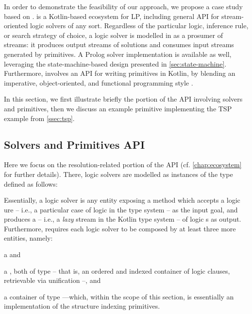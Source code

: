 \documentclass[12pt,a4paper,openright,twoside]{book}
\begin{document}
In order to demonstrate the feasibility of our approach, we propose a case study based on \twopkt{}.
%
\twopkt{} \cite{cco-softwarex-2021-2pkt} is a Kotlin-based ecosystem for LP, including general API for stream-oriented logic solvers of any sort.
%
Regardless of the particular logic, inference rule, or search strategy of choice, a logic solver is modelled in \twopkt{} as a prosumer of streams: it produces output streams of solutions and consumes input streams generated by primitives.
%
A Prolog solver implementation is available as well, leveraging the state-machine-based design presented in \cref{sec:state-machine}.
%
Furthermore, \twopkt{} involves an API for writing primitives in Kotlin, by blending an imperative, object-oriented, and functional programming style .

In this section, we first illustrate briefly the portion of the \twopkt{} API involving solvers and primitives, then we discuss an example primitive implementing the TSP example from \ref{ssec:tsp}.

\subsection{\twopkt{} Solvers and Primitives API}

Here we focus on the resolution-related portion of the \twopkt{} API (cf. \cref{chap:ecosystem} for further details).
%
There, logic solvers are modelled as instances of the  type defined as follows:
%

%
Essentially, a logic solver is any entity exposing a method  which accepts a logic ure -- i.e., a particular case of logic  in the \twopkt{} type system -- as the input goal, and produces a  -- i.e., a \emph{lazy} stream in the Kotlin type system -- of logic s as output.
%
Furthermore, \twopkt{} requires each logic solver to be composed by at least three more entities, namely:
%
\begin{inlinelist}
    \item a  and
    \item a , both of type  -- that is, an ordered and indexed container of logic clauses, retrievable via unification --, and
    \item a  container of type ---which, within the scope of this section, is essentially an implementation of the structure indexing primitives.
\end{inlinelist}
\end{document}
